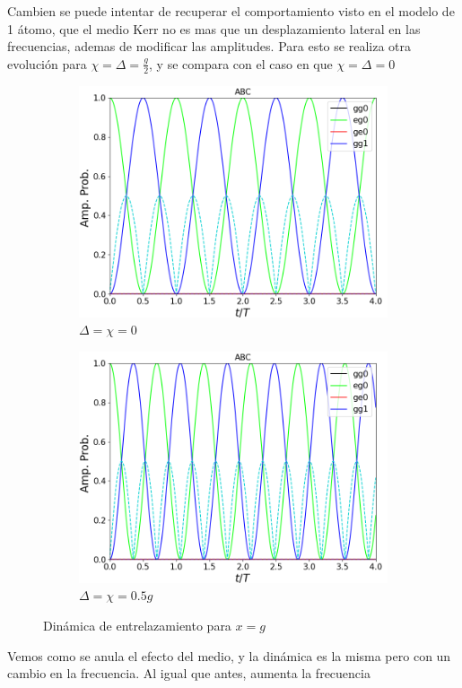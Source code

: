Cambien se puede intentar de recuperar el comportamiento visto en el modelo de 1 átomo, que el medio Kerr no es mas que un desplazamiento lateral en las frecuencias, ademas de modificar las amplitudes. Para esto se realiza otra evolución para $\chi=\Delta=\frac{g}{2}$, y se compara con el caso en que $\chi=\Delta=0$
\begin{figure}[h]
    \centering
    \begin{subfigure}{0.49\textwidth}
        \includegraphics[width=\textwidth]{figuras/ch4/d=x=0 eg0 abc.png}
        \caption{$\Delta=\chi=0$}
        \label{fig4:comparacion kerr pob 1}
    \end{subfigure}
    \hfill
    \begin{subfigure}{0.49\textwidth}
        \includegraphics[width=\textwidth]{figuras/ch4/d=x=0.5 eg0 abc.png}
        \caption{$\Delta=\chi=0.5g$}
        \label{fig4:comparacion ker pob 2}
    \end{subfigure}
    \caption{Dinámica de entrelazamiento para $x=g$}
    \label{fig4:comparacion d vs x}
\end{figure}
Vemos como se anula el efecto del medio, y la dinámica es la misma pero con un cambio en la frecuencia. Al igual que antes, aumenta la frecuencia

